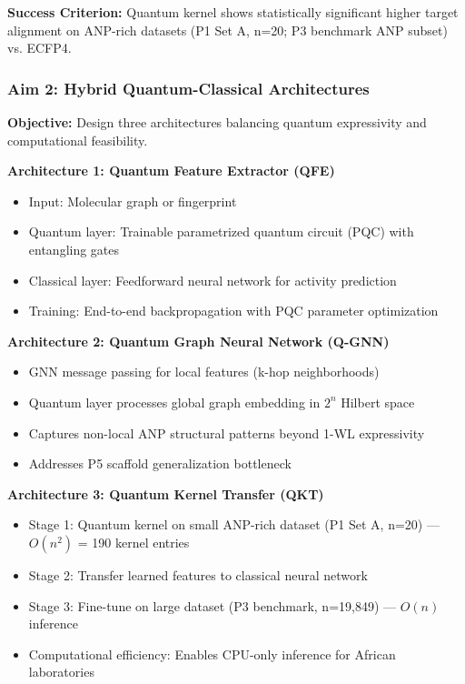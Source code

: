 \documentclass[11pt,a4paper]{article}
\begin{document}
\textbf{Success Criterion:} Quantum kernel shows statistically significant higher target alignment on ANP-rich datasets (P1 Set A, n=20; P3 benchmark ANP subset) vs. ECFP4.

\subsubsection{Aim 2: Hybrid Quantum-Classical Architectures}

\textbf{Objective:} Design three architectures balancing quantum expressivity and computational feasibility.

\textbf{Architecture 1: Quantum Feature Extractor (QFE)}
\begin{itemize}
    \item Input: Molecular graph or fingerprint
    \item Quantum layer: Trainable parametrized quantum circuit (PQC) with entangling gates
    \item Classical layer: Feedforward neural network for activity prediction
    \item Training: End-to-end backpropagation with PQC parameter optimization
\end{itemize}

\textbf{Architecture 2: Quantum Graph Neural Network (Q-GNN)}
\begin{itemize}
    \item GNN message passing for local features (k-hop neighborhoods)
    \item Quantum layer processes global graph embedding in $2^n$ Hilbert space
    \item Captures non-local ANP structural patterns beyond 1-WL expressivity
    \item Addresses P5 scaffold generalization bottleneck
\end{itemize}

\textbf{Architecture 3: Quantum Kernel Transfer (QKT)}
\begin{itemize}
    \item Stage 1: Quantum kernel on small ANP-rich dataset (P1 Set A, n=20) — $O(n^2)$ = 190 kernel entries
    \item Stage 2: Transfer learned features to classical neural network
    \item Stage 3: Fine-tune on large dataset (P3 benchmark, n=19,849) — $O(n)$ inference
    \item Computational efficiency: Enables CPU-only inference for African laboratories
\end{itemize}
\end{document}
